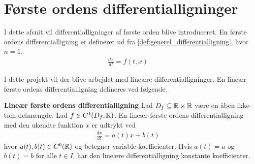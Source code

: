 \section{Første ordens differentialligninger}

I dette afsnit vil differentialligninger af første orden blive introduceret. 
En første ordens differentialligning er defineret ud fra \autoref{def:generel_differentialligning}, hvor $n=1$. 
\begin{align}
    \frac{dx}{dt}=f(t,x)  
\end{align}

I dette projekt vil der blive arbejdet med lineære differentialligninger. En lineær første ordens differentialligning defineres ved følgende. \\
\begin{minipage}\textwidth
\begin{defn} \textbf{Lineær første ordens differentialligning} %
\newline
Lad $D_f \subseteq \mathbb{R} \times \mathbb{R}$ være en åben ikke-tom delmængde. Lad $f \in C^1(D_f,\mathbb{R})$. En lineær første ordens differentialligning med den ukendte funktion $x$ er udtrykt ved
\begin{align}
    \frac{dx}{dt}=a(t)x+b(t)
\end{align}
hvor $a(t), b(t) \in C^0(\mathbb{R})$ og betegner variable koefficienter. Hvis $a(t)=a$ og $b(t)=b$ for alle $t\in I$, har den lineære differentialligning konstante koefficienter.
\end{defn}
\end{minipage}





